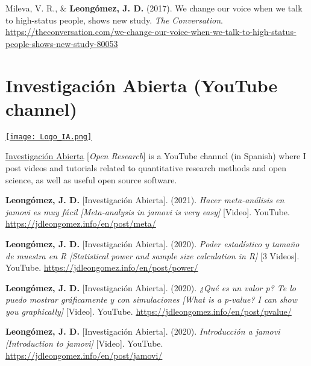 \documentclass[11pt,a4paper,]{awesome-cv}
\begin{document}
Mileva, V. R., \& \textbf{Leongómez, J. D.} (2017). We change our voice
when we talk to high-status people, shows new study. \emph{The
Conversation}.
\url{https://theconversation.com/we-change-our-voice-when-we-talk-to-high-status-people-shows-new-study-80053}

\endgroup

\hypertarget{investigaciuxf3n-abierta-youtube-channel}{%
\section{Investigación Abierta (YouTube
channel)}\label{investigaciuxf3n-abierta-youtube-channel}}

\begin{minipage}[c]{0.15\linewidth}
\href{https://www.youtube.com/@InvestigacionAbierta}{\texttt{[image: Logo\_IA.png]}}
\end{minipage} \begin{minipage}[c]{0.85\linewidth}
\textcolor{red}{\faYoutube} \href{https://www.youtube.com/@InvestigacionAbierta}{Investigación Abierta} [\textit{Open Research}] is a YouTube channel (in Spanish) where I post videos and tutorials related to quantitative research methods and open science, as well as useful open source software.
\end{minipage}

\begingroup
\footnotesize
\setlength{\parindent}{-0.5in}
\setlength{\leftskip}{0.5in}

\textbf{Leongómez, J. D.} {[}Investigación Abierta{]}. (2021).
\emph{Hacer meta-análisis en jamovi es muy fácil {[}Meta-analysis in
jamovi is very easy{]}} {[}Video{]}. YouTube.
\url{https://jdleongomez.info/en/post/meta/}

\textbf{Leongómez, J. D.} {[}Investigación Abierta{]}. (2020).
\emph{Poder estadístico y tamaño de muestra en R {[}Statistical power
and sample size calculation in R{]}} {[}3 Videos{]}. YouTube.
\url{https://jdleongomez.info/en/post/power/}

\textbf{Leongómez, J. D.} {[}Investigación Abierta{]}. (2020).
\emph{¿Qué es un valor p? Te lo puedo mostrar gráficamente y con
simulaciones {[}What is a p-value? I can show you graphically{]}}
{[}Video{]}. YouTube. \url{https://jdleongomez.info/en/post/pvalue/}

\textbf{Leongómez, J. D.} {[}Investigación Abierta{]}. (2020).
\emph{Introducción a jamovi {[}Introduction to jamovi{]}} {[}Video{]}.
YouTube. \url{https://jdleongomez.info/en/post/jamovi/}
\end{document}
